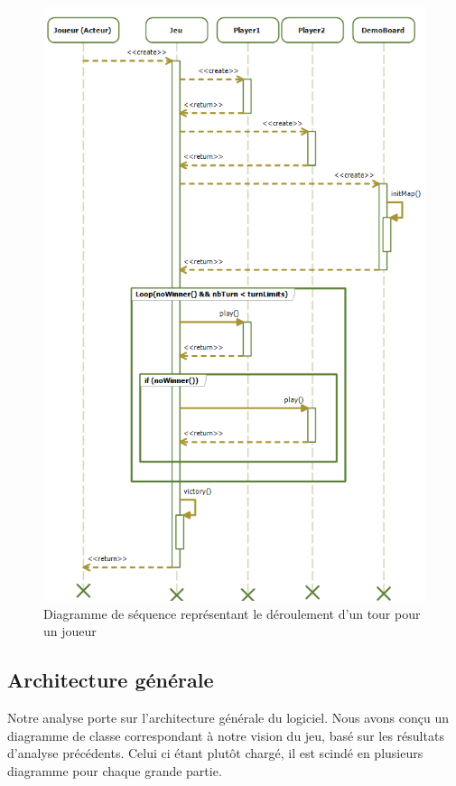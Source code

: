 \begin{figure}[!h] 
\centerline{\includegraphics[scale=0.6]{img/sequence_jeu_ex.png}}
   \caption{\label{étiquette} Diagramme de séquence représentant le déroulement d'un tour pour un joueur}
\label{sequenceJeu}
\end{figure}

\subsection{Architecture générale}
Notre analyse porte sur l'architecture générale du logiciel. Nous avons conçu un diagramme de classe correspondant à notre vision du jeu, basé sur les résultats d'analyse précédents. Celui ci étant plutôt chargé, il est scindé en plusieurs diagramme pour chaque grande partie.

